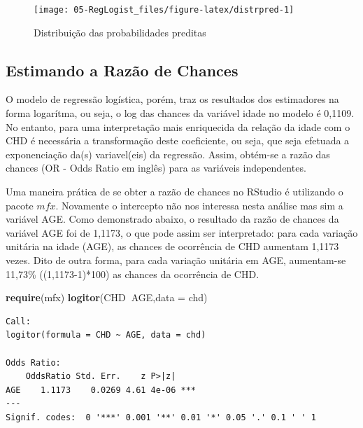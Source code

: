 \documentclass[12pt,brazil,oneside]{book}
\newenvironment{Shaded}{\begin{snugshade}}{\end{snugshade}}
\newcommand{\DataTypeTok}[1]{\textcolor[rgb]{0.13,0.29,0.53}{#1}}
\newcommand{\KeywordTok}[1]{\textcolor[rgb]{0.13,0.29,0.53}{\textbf{#1}}}
\newcommand{\NormalTok}[1]{#1}
\newcommand{\OperatorTok}[1]{\textcolor[rgb]{0.81,0.36,0.00}{\textbf{#1}}}
\begin{document}
\begin{figure}[h]

{\centering \texttt{[image: 05-RegLogist\_files/figure-latex/distrpred-1]} 

}

\caption{Distribuição das probabilidades preditas}\label{fig:distrpred}
\end{figure}

\hypertarget{estimando-a-razao-de-chances}{%
\subsection{Estimando a Razão de
Chances}\label{estimando-a-razao-de-chances}}

O modelo de regressão logística, porém, traz os resultados dos
estimadores na forma logarítma, ou seja, o log das chances da variável
idade no modelo é 0,1109. No entanto, para uma interpretação mais
enriquecida da relação da idade com o CHD é necessária a transformação
deste coeficiente, ou seja, que seja efetuada a exponenciação da(s)
variavel(eis) da regressão. Assim, obtém-se a razão das chances (OR -
Odds Ratio em inglês) para as variáveis independentes.

Uma maneira prática de se obter a razão de chances no RStudio é
utilizando o pacote \(mfx\). Novamente o intercepto não nos interessa
nesta análise mas sim a variável AGE. Como demonstrado abaixo, o
resultado da razão de chances da variável AGE foi de 1,1173, o que pode
assim ser interpretado: para cada variação unitária na idade (AGE), as
chances de ocorrência de CHD aumentam 1,1173 vezes. Dito de outra forma,
para cada variação unitária em AGE, aumentam-se 11,73\% ((1,1173-1)*100)
as chances da ocorrência de CHD.

\begin{Shaded}
\begin{Highlighting}[]
\KeywordTok{require}\NormalTok{(mfx)}
\KeywordTok{logitor}\NormalTok{(CHD}\OperatorTok{~}\NormalTok{AGE,}\DataTypeTok{data =}\NormalTok{ chd)}
\end{Highlighting}
\end{Shaded}

\begin{verbatim}
Call:
logitor(formula = CHD ~ AGE, data = chd)

Odds Ratio:
    OddsRatio Std. Err.    z P>|z|    
AGE    1.1173    0.0269 4.61 4e-06 ***
---
Signif. codes:  0 '***' 0.001 '**' 0.01 '*' 0.05 '.' 0.1 ' ' 1
\end{verbatim}
\end{document}
